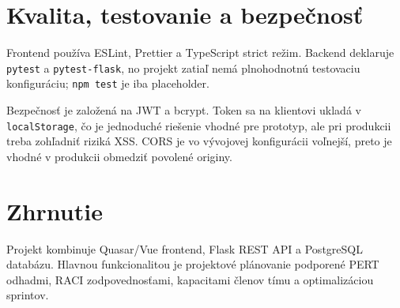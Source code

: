 ﻿\documentclass[12pt,a4paper]{article}
\begin{document}
\section{Kvalita, testovanie a bezpečnosť}

Frontend používa ESLint, Prettier a TypeScript strict režim. Backend deklaruje \texttt{pytest} a \texttt{pytest-flask}, no projekt zatiaľ nemá plnohodnotnú testovaciu konfiguráciu; \texttt{npm test} je iba placeholder.

Bezpečnosť je založená na JWT a bcrypt. Token sa na klientovi ukladá v \texttt{localStorage}, čo je jednoduché riešenie vhodné pre prototyp, ale pri produkcii treba zohľadniť riziká XSS. CORS je vo vývojovej konfigurácii voľnejší, preto je vhodné v produkcii obmedziť povolené originy.

\section{Zhrnutie}

Projekt kombinuje Quasar/Vue frontend, Flask REST API a PostgreSQL databázu. Hlavnou funkcionalitou je projektové plánovanie podporené PERT odhadmi, RACI zodpovednosťami, kapacitami členov tímu a optimalizáciou sprintov.
\end{document}
